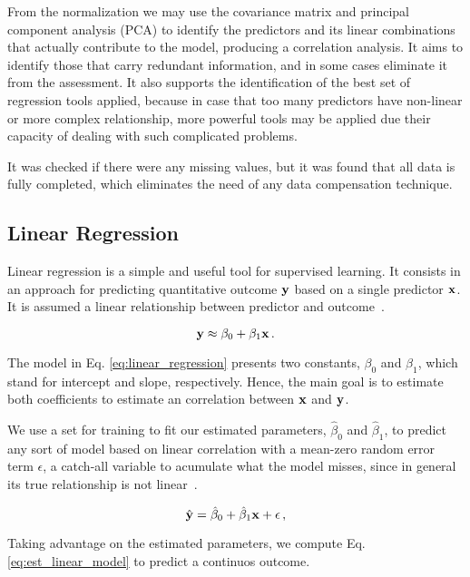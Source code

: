 From the normalization we may use the covariance matrix and principal component analysis (PCA) to identify the predictors and its linear combinations that actually contribute to the model, producing a correlation analysis. It aims to identify those that carry redundant information, and in some cases eliminate it from the assessment. It also supports the identification of the best set of regression tools applied, because in case that too many predictors have non-linear or more complex relationship, more powerful tools may be applied due their capacity of dealing with such complicated problems. 

It was checked if there were any missing values, but it was found that all data is fully completed, which eliminates the need of any data compensation technique. 

\subsection{Linear Regression}
Linear regression is a simple and useful tool for supervised learning. It consists in an approach for predicting  quantitative outcome ${\bf y}$ based on a single predictor ${\bf x}$. It is assumed a linear relationship between predictor and outcome~\cite{James2013}.

\begin{equation}
{\bf y} \approx \beta_0 + \beta_1 {\bf x} \, . \label{eq:linear_regression}
\end{equation}

The model in Eq. \ref{eq:linear_regression} presents two constants, $\beta_0$ and $\beta_1$, which stand for intercept and slope, respectively. Hence, the main goal is to estimate both coefficients to estimate an correlation between ${\bf x}$ and ${\bf y}$.

We use a set for training to fit our estimated parameters, $\hat{\beta}_{0}$ and $\hat{\beta}_{1}$, to predict any sort of model based on linear correlation with a mean-zero random error term $\epsilon$, a catch-all variable to acumulate what the model misses, since in general its true relationship is not linear~\cite{James2013}.

\begin{equation}
\hat{{\bf y}} = \hat{\beta}_{0} + \hat{\beta}_{1} {\bf x} + {\bf \epsilon} \, ,
\label{eq:est_linear_model}
\end{equation}

Taking advantage on the estimated parameters, we compute Eq. \ref{eq:est_linear_model} to predict a continuos outcome. 

